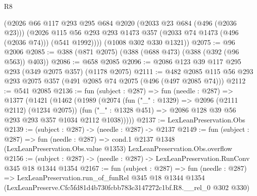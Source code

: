 \begin{lexlean}{R8}
\begin{coremodule}
        (@2026
          @66
          @117
          @293
          @295
          @684
          @2020
          (@2033 @23 @684 (@496 (@2036 @23)))
          (@2026 @115 @56 @293 @293 @1473 @357 (@2033 @74 @1473 (@496 (@2036 @74))) (@541 @1992))))
      (@1008 @302 @330 @1321))
@2075 := @96 @2006
@2085 := @388 (@871 @2075) (@388 (@688 @473) (@388 (@392 (@96 @563)) @403))
@2086 := @658 @2085
@2096 := @2086 @123 @39 @117 @295 @293 (@349 @2075 @357) (@1178 @2075)
@2111 := @482 @2085 @115 @56 @293 @293 @2075 @357 (@491 @2085 @74 @2075 (@496 (@497 @2085 @74)))
@2112 := @541 @2085
@2136 := fun (subject : @287) =>
  fun (needle : @287) =>
  @1377
    (@1421
      (@1462
        (@1989
          (@2074
            (fun ("_" : @1329) => @2096 (@2111 @2112) (@1234 @2075))
            (fun ("_" : @1328 @451) => @2086 @128 @39 @56 @293 @293 @357 @1034 @2112 @1038)))))
@2137 := LexLeanPreservation.Obs
@2139 := (subject : @287) -> (needle : @287) -> @2137
@2149 := fun (subject : @287) =>
  fun (needle : @287) =>
  cond.{1} @2137 @1348 (LexLeanPreservation.Obs.value @1353) LexLeanPreservation.Obs.overflow
@2156 := (subject : @287) -> (needle : @287) -> LexLeanPreservation.RunConv @345 @18 @1344 @1354
@2167 := fun (subject : @287) =>
  fun (needle : @287) =>
  LexLeanPreservation.run_of_funRel
    @345
    @18
    @1344
    @1354
    (LexLeanPreserve.Cfc5fd81d4b730fcbb783c3147272c1bf.R8.__rel_0 @302 @330)
\end{coremodule}
\end{lexlean}

